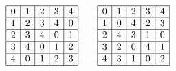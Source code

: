 {\renewcommand{\arraystretch}{2}
$$
\begin{array}{|c|c|c|c|c|}
\hline
0&1&2&3&4\\
\hline
1&2&3&4&0\\
\hline
2&3&4&0&1\\
\hline
3&4&0&1&2\\
\hline
4&0&1&2&3\\
\hline
\end{array}
\qquad
\begin{array}{|c|c|c|c|c|}
\hline
0&1&2&3&4\\
\hline
1&0&4&2&3\\
\hline
2&4&3&1&0\\
\hline
3&2&0&4&1\\
\hline
4&3&1&0&2\\
\hline
\end{array}
$$}